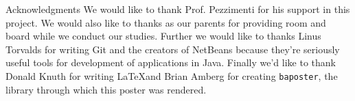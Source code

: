 \documentclass[landscape,fontscale=.4,paperwidth=48in,paperheight=36in]{baposter} %
\begin{document}
\begin{poster}

\begin{posterbox}[name=conclusion, column=44, below=padding, span=14]{Acknowledgments} 
We would like to thank Prof. Pezzimenti for his support in this project. We would also like to thanks as our parents for providing room and board while we conduct our studies. Further we would like to thanks Linus Torvalds for writing Git and the creators of NetBeans because they're seriously useful tools for development of applications in Java. Finally we'd like to thank Donald Knuth for writing \LaTeX and Brian Amberg for creating \verb|baposter|, the library through which this poster was rendered.
\end{posterbox}

\end{poster}
\end{document}
